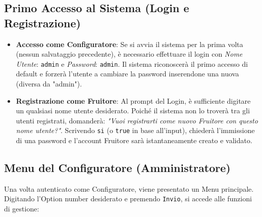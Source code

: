 \subsection{Primo Accesso al Sistema (Login e Registrazione)}
\begin{itemize}
    \item \textbf{Accesso come Configuratore}: Se si avvia il sistema per la prima volta (nessun salvataggio precedente), è necessario effettuare il login con \textit{Nome Utente}: \texttt{admin} e \textit{Password}: \texttt{admin}. Il sistema riconoscerà il primo accesso di default e forzerà l'utente a cambiare la password inserendone una nuova (diversa da "admin").
    \item \textbf{Registrazione come Fruitore}: Al prompt del Login, è sufficiente digitare un qualsiasi nome utente desiderato. Poiché il sistema non lo troverà tra gli utenti registrati, domanderà: \textit{"Vuoi registrarti come nuovo Fruitore con questo nome utente?"}. Scrivendo \texttt{si} (o \texttt{true} in base all'input), chiederà l'immissione di una password e l'account Fruitore sarà istantaneamente creato e validato.
\end{itemize}

\subsection{Menu del Configuratore (Amministratore)}
Una volta autenticato come Configuratore, viene presentato un Menu principale. Digitando l'Option number desiderato e premendo \texttt{Invio}, si accede alle funzioni di gestione:


